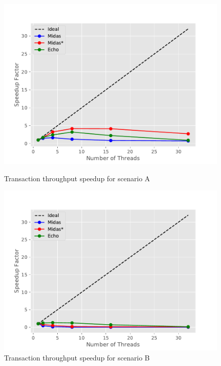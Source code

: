
\begin{figure}
\begin{minipage}[l]{0.50\textwidth}
        \includegraphics[width=\textwidth]{figures/bench/spd-ss}
        \caption{Transaction throughput speedup for scenario A}
\end{minipage}
\begin{minipage}[l]{0.50\textwidth}
        \includegraphics[width=\textwidth]{figures/bench/spd-sl}
        \caption{Transaction throughput speedup for scenario B}
\end{minipage}


\end{figure}
